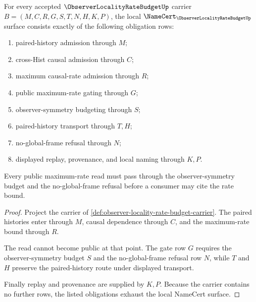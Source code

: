 \begin{theorem}
\label{thm:observer-locality-rate-budget-namecert-obligations}
For every accepted $\ObserverLocalityRateBudgetUp$ carrier $B=(M,C,R,G,S,T,N,H,K,P)$, the local $\NameCert_{\ObserverLocalityRateBudgetUp}$ surface consists exactly of the following obligation rows:
\begin{enumerate}
\item paired-history admission through $M$;
\item cross-Hist causal admission through $C$;
\item maximum causal-rate admission through $R$;
\item public maximum-rate gating through $G$;
\item observer-symmetry budgeting through $S$;
\item paired-history transport through $T,H$;
\item no-global-frame refusal through $N$;
\item displayed replay, provenance, and local naming through $K,P$.
\end{enumerate}
Every public maximum-rate read must pass through the observer-symmetry budget and the no-global-frame refusal before a consumer may cite the rate bound.
\end{theorem}
\begin{proof}
Project the carrier of \autoref{def:observer-locality-rate-budget-carrier}. The paired histories enter through $M$, causal dependence through $C$, and the maximum-rate bound through $R$.

The read cannot become public at that point. The gate row $G$ requires the observer-symmetry budget $S$ and the no-global-frame refusal row $N$, while $T$ and $H$ preserve the paired-history route under displayed transport.

Finally replay and provenance are supplied by $K,P$. Because the carrier contains no further rows, the listed obligations exhaust the local NameCert surface.
\end{proof}

